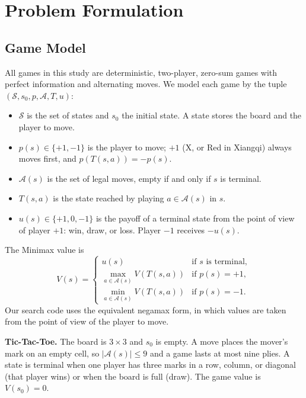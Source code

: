 \section{Problem Formulation}
\label{sec:problem_formulation}

\subsection{Game Model}
\label{subsec:game_model}

All games in this study are deterministic, two-player, zero-sum games with perfect information and alternating moves. We model each game by the tuple $(\mathcal{S}, s_0, p, \mathcal{A}, T, u)$:
\begin{itemize}
    \item $\mathcal{S}$ is the set of states and $s_0$ the initial state. A state stores the board and the player to move.
    \item $p(s) \in \{+1, -1\}$ is the player to move; $+1$ (X, or Red in Xiangqi) always moves first, and $p(T(s,a)) = -p(s)$.
    \item $\mathcal{A}(s)$ is the set of legal moves, empty if and only if $s$ is terminal.
    \item $T(s, a)$ is the state reached by playing $a \in \mathcal{A}(s)$ in $s$.
    \item $u(s) \in \{+1, 0, -1\}$ is the payoff of a terminal state from the point of view of player $+1$: win, draw, or loss. Player $-1$ receives $-u(s)$.
\end{itemize}
The Minimax value is
\begin{equation}
V(s) = \begin{cases}
u(s) & \text{if } s \text{ is terminal},\\
\max_{a \in \mathcal{A}(s)} V(T(s,a)) & \text{if } p(s) = +1,\\
\min_{a \in \mathcal{A}(s)} V(T(s,a)) & \text{if } p(s) = -1.
\end{cases}
\label{eq:minimax}
\end{equation}
Our search code uses the equivalent negamax form, in which values are taken from the point of view of the player to move.

\textbf{Tic-Tac-Toe.} The board is $3\times 3$ and $s_0$ is empty. A move places the mover's mark on an empty cell, so $|\mathcal{A}(s)| \le 9$ and a game lasts at most nine plies. A state is terminal when one player has three marks in a row, column, or diagonal (that player wins) or when the board is full (draw). The game value is $V(s_0) = 0$.

